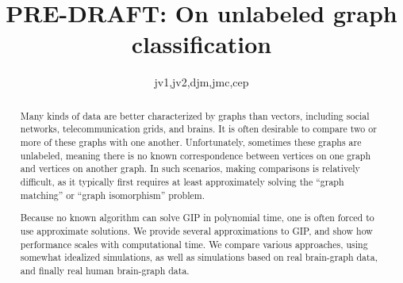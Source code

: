  
\usepackage{url}

\newcommand{\mcE}{\mathcal{E}}
\newcommand{\mcT}{\mathcal{T}}
\newcommand{\mcG}{\mathcal{G}}
\newcommand{\mcM}{\mathcal{M}}
\newcommand{\mcL}{\mathcal{L}}
\newcommand{\hatmcE}{\widehat{\mcE}}
\newcommand{\hatp}{\widehat{p}}
\newcommand{\hatP}{\widehat{P}}
\newcommand{\hatQ}{\widehat{Q}}
\newcommand{\hatL}{\widehat{L}}
\newcommand{\mhP}{\widehat{\PP}}
\newcommand{\tildeA}{\widetilde{A}}

\newcommand{\defa}{\begin{defi}}
\newcommand{\defb}{\end{defi}}

\newtheorem{Rem}{Remark}%
\newtheorem{Alg}{Algorithm}%
\newtheorem{Thm}{Theorem}[section]
\newtheorem{Lem}{Lemma}[section]
\newtheorem{Def}{Definition}[section]

\title{PRE-DRAFT: On unlabeled graph classification}

\author{jv1,jv2,djm,jmc,cep}



\maketitle
\begin{abstract}
	
Many kinds of data are better characterized by graphs than vectors, including social networks, telecommunication grids, and brains.  It is often desirable to compare two or more of these graphs with one another.  Unfortunately, sometimes these graphs are unlabeled, meaning there is no known correspondence between vertices on one graph and vertices on another graph. In such scenarios, making comparisons is relatively difficult, as it typically first requires at least approximately solving the ``graph matching'' or ``graph isomorphism'' problem.  

Because no known algorithm can solve GIP in polynomial time, one is often forced to use approximate solutions.  We provide several approximations to GIP, and show how performance scales with computational time.  We compare various approaches, using somewhat idealized simulations, as well as simulations based on real brain-graph data, and finally real human brain-graph data.

\end{abstract}

